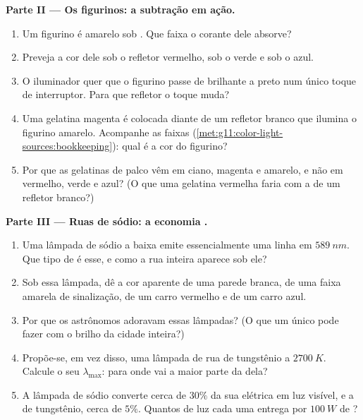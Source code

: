 \begin{problem}
\medskip
\noindent\textbf{Parte II --- Os figurinos: a subtração em ação.}
\begin{enumerate}[resume]
  \item Um figurino é amarelo sob . Que faixa o corante dele
        absorve?
  \item Preveja a cor dele sob o refletor vermelho, sob o verde e sob o
        azul.
  \item O iluminador quer que o figurino passe de brilhante a preto num
        único toque de interruptor. Para que refletor o toque muda?
  \item Uma gelatina magenta é colocada diante de um refletor branco que
        ilumina o figurino amarelo. Acompanhe as faixas
        (\cref{met:g11:color-light-sources:bookkeeping}): qual é a cor do
        figurino?
  \item Por que as gelatinas de palco vêm em ciano, magenta e amarelo, e
        não em vermelho, verde e azul? (O que uma gelatina vermelha faria
        com a  de um refletor branco?)
\end{enumerate}

\medskip
\noindent\textbf{Parte III --- Ruas de sódio: a economia .}
\begin{enumerate}[resume]
  \item Uma lâmpada de sódio a baixa  emite essencialmente uma
        linha em $\qty{589}{nm}$. Que tipo de  é esse, e como a
        rua inteira aparece sob ele?
  \item Sob essa lâmpada, dê a cor aparente de uma parede branca, de uma
        faixa amarela de sinalização, de um carro vermelho e de um carro
        azul.
  \item Por que os astrônomos adoravam essas lâmpadas? (O que um único
         pode fazer com o brilho da cidade inteira?)
  \item Propõe-se, em vez disso, uma lâmpada de rua de tungstênio a
        $\qty{2700}{K}$. Calcule o seu $\lambda_{\max}$: para onde vai a
        maior parte da  dela?
  \item A lâmpada de sódio converte cerca de $30\%$ da sua 
        elétrica em luz visível, e a de tungstênio, cerca de $5\%$.
        Quantos  de luz cada uma entrega por $\qty{100}{W}$ de
        ?
\end{enumerate}


\end{problem}
